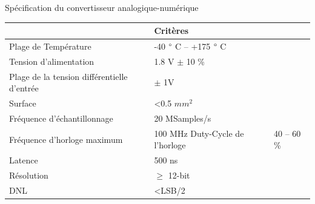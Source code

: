 \begin{mdframed}[linecolor=Prune,linewidth=1]
\begin{center}
    \centering
    \caption[]{Spécification du convertisseur analogique-numérique}
    \label{tbl:adc-spec-fr}
    \begin{tabular}{ll}
        \toprule
                                     & Critères                                                                                                                                                   \\ \midrule
    Plage de Température            & -40 $\degree$ C -- +175 $\degree$ C                                                                                               \\
    Tension d'alimentation                   & 1.8 V $\pm$ 10 \%                                                                                                                              \\
    Plage de la tension différentielle d'entrée & $\pm$ 1V                                                                                                                                       \\
    Surface                             & \textless 0.5 \(mm^2\)                                                                                                                                      \\
    Fréquence d'échantillonnage       & 20 MSamples/s                                                                                                                                               \\
    Fréquence d'horloge maximum      & 100 MHz
    Duty-Cycle de l'horloge                & 40 -- 60 \%                                                                                                                                                 \\
    Latence                          & 500 ns                                                                                                                                                      \\
    Résolution                       & $\geq$ 12-bit                                                                                                                                     \\
    DNL                              & \textless LSB/2                                                                                                                                             \\

\end{tabular}
\end{center}
\end{mdframed}
